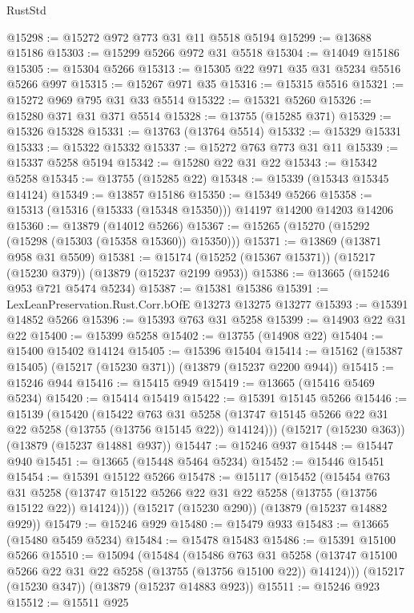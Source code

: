 \begin{lexlean}{RustStd}
\begin{coremodule}
@15298 := @15272 @972 @773 @31 @11 @5518 @5194
@15299 := @13688 @15186
@15303 := @15299 @5266 @972 @31 @5518
@15304 := @14049 @15186
@15305 := @15304 @5266
@15313 := @15305 @22 @971 @35 @31 @5234 @5516 @5266 @997
@15315 := @15267 @971 @35
@15316 := @15315 @5516
@15321 := @15272 @969 @795 @31 @33 @5514
@15322 := @15321 @5260
@15326 := @15280 @371 @31 @371 @5514
@15328 := @13755 (@15285 @371)
@15329 := @15326 @15328
@15331 := @13763 (@13764 @5514)
@15332 := @15329 @15331
@15333 := @15322 @15332
@15337 := @15272 @763 @773 @31 @11
@15339 := @15337 @5258 @5194
@15342 := @15280 @22 @31 @22
@15343 := @15342 @5258
@15345 := @13755 (@15285 @22)
@15348 := @15339 (@15343 @15345 @14124)
@15349 := @13857 @15186
@15350 := @15349 @5266
@15358 := @15313 (@15316 (@15333 (@15348 @15350))) @14197 @14200 @14203 @14206
@15360 := @13879 (@14012 @5266)
@15367 := @15265 (@15270 (@15292 (@15298 (@15303 (@15358 @15360)) @15350)))
@15371 := @13869 (@13871 @958 @31 @5509)
@15381 := @15174 (@15252 (@15367 @15371)) (@15217 (@15230 @379)) (@13879 (@15237 @2199 @953))
@15386 := @13665 (@15246 @953 @721 @5474 @5234)
@15387 := @15381 @15386
@15391 := LexLeanPreservation.Rust.Corr.bOfE @13273 @13275 @13277
@15393 := @15391 @14852 @5266
@15396 := @15393 @763 @31 @5258
@15399 := @14903 @22 @31 @22
@15400 := @15399 @5258
@15402 := @13755 (@14908 @22)
@15404 := @15400 @15402 @14124
@15405 := @15396 @15404
@15414 := @15162 (@15387 @15405) (@15217 (@15230 @371)) (@13879 (@15237 @2200 @944))
@15415 := @15246 @944
@15416 := @15415 @949
@15419 := @13665 (@15416 @5469 @5234)
@15420 := @15414 @15419
@15422 := @15391 @15145 @5266
@15446 := @15139
    (@15420
      (@15422
        @763
        @31
        @5258
        (@13747 @15145 @5266 @22 @31 @22 @5258 (@13755 (@13756 @15145 @22)) @14124)))
    (@15217 (@15230 @363))
    (@13879 (@15237 @14881 @937))
@15447 := @15246 @937
@15448 := @15447 @940
@15451 := @13665 (@15448 @5464 @5234)
@15452 := @15446 @15451
@15454 := @15391 @15122 @5266
@15478 := @15117
    (@15452
      (@15454
        @763
        @31
        @5258
        (@13747 @15122 @5266 @22 @31 @22 @5258 (@13755 (@13756 @15122 @22)) @14124)))
    (@15217 (@15230 @290))
    (@13879 (@15237 @14882 @929))
@15479 := @15246 @929
@15480 := @15479 @933
@15483 := @13665 (@15480 @5459 @5234)
@15484 := @15478 @15483
@15486 := @15391 @15100 @5266
@15510 := @15094
    (@15484
      (@15486
        @763
        @31
        @5258
        (@13747 @15100 @5266 @22 @31 @22 @5258 (@13755 (@13756 @15100 @22)) @14124)))
    (@15217 (@15230 @347))
    (@13879 (@15237 @14883 @923))
@15511 := @15246 @923
@15512 := @15511 @925

\end{coremodule}
\end{lexlean}

